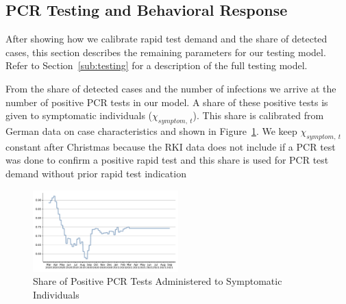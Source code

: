 \subsection{PCR Testing and Behavioral Response}
\label{subsec:pcr_testing_and_behavioral_response}


After showing how we calibrate rapid test demand and the share of detected cases, this
section describes the remaining parameters for our testing model. Refer to
Section~\ref{sub:testing} for a description of the full testing model.

From the share of detected cases and the number of infections we arrive at the number of
positive PCR tests in our model. A share of these positive tests is given to symptomatic
individuals ($\chi_{symptom,\:t}$). This share is calibrated from German data on case
characteristics \citep{RKICaseCharacteristics} and shown in
Figure~\ref{fig:share_pcr_to_symptomatic}. We keep $\chi_{symptom,\:t}$ constant after
Christmas because the RKI data does not include if a PCR test was done to confirm a
positive rapid test and this share is used for PCR test demand without prior rapid test
indication

\begin{figure}
    \centering
    \includegraphics[width=0.5\textwidth]{figures/results/figures/data/testing/used_share_of_pcr_tests_going_to_symptomatics}
    \caption{Share of Positive PCR Tests Administered to Symptomatic Individuals}
    \label{fig:share_pcr_to_symptomatic}
\end{figure}

